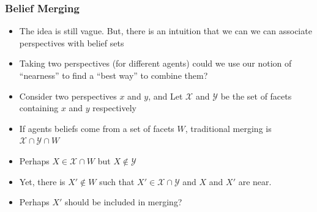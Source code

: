 \documentclass{beamer}
\begin{document}
\begin{frame}[fragile]
	\frametitle{Belief Merging}
	\begin{itemize}
		
		\item The idea is still vague. But, there is an intuition that we can we can associate perspectives with belief sets
		
		\item Taking two perspectives (for different agents) could we use our notion of ``nearness'' to find a ``best way'' to combine them?
		\item Consider two perspectives $x$ and $y$, and Let $\mathcal{X}$ and $\mathcal{Y}$ be the set of facets containing $x$ and $y$ respectively
		
		\item If agents beliefs come from a set of facets $W$, traditional merging is $\mathcal{X}\cap\mathcal{Y}\cap W$
		
		\item Perhaps $X\in\mathcal{X}\cap W$ but $X\notin\mathcal{Y}$
		
		\item Yet, there is $X'\notin W$ such that $X'\in\mathcal{X}\cap\mathcal{Y}$ and $X$ and $X'$ are near.
		
		\item Perhaps $X'$ should be included in merging?
	\end{itemize}
\end{frame}
\end{document}
